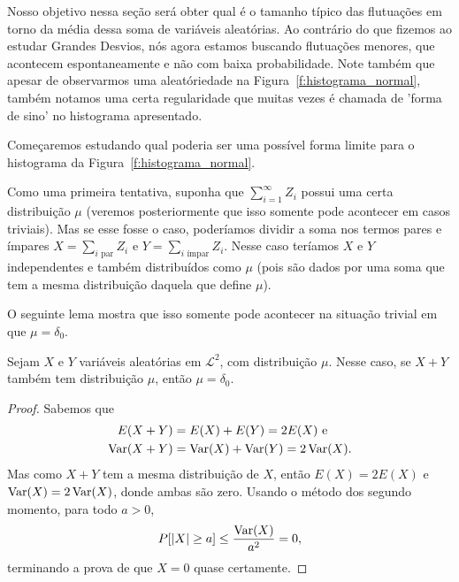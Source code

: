 Nosso objetivo nessa seção será obter qual é o tamanho típico das flutuações em torno da média dessa soma de variáveis aleatórias.
Ao contrário do que fizemos ao estudar Grandes Desvios, nós agora estamos buscando flutuações menores, 
que acontecem espontaneamente e não com baixa probabilidade.
Note também que apesar de observarmos uma aleatóriedade na Figura~\ref{f:histograma_normal}, 
também notamos uma certa regularidade que muitas vezes é chamada de 'forma de sino' no histograma apresentado.


Começaremos estudando qual poderia ser uma possível forma limite para o histograma da Figura~\ref{f:histograma_normal}.

Como uma primeira tentativa, suponha que $\sum_{i=1}^\infty Z_i$ possui uma certa distribuição $\mu$ (veremos posteriormente que isso somente pode acontecer em casos triviais).
Mas se esse fosse o caso, poderíamos dividir a soma nos termos pares e ímpares $X = \sum_{i \text{ par}} Z_i$ e $Y = \sum_{i \text{ ímpar}} Z_i$.
Nesse caso teríamos $X$ e $Y$ independentes e também distribuídos como $\mu$ (pois são dados por uma soma que tem a mesma distribuição daquela que define $\mu$).

O seguinte lema mostra que isso somente pode acontecer na situação trivial em que $\mu = \delta_0$.

\begin{lemma}
  Sejam $X$ e $Y$ variáveis aleatórias em $\mathcal{L}^2$, \iid com distribuição $\mu$.
  Nesse caso, se $X + Y$ também tem distribuição $\mu$, então $\mu = \delta_0$.
\end{lemma}

\begin{proof}
  Sabemos que
  \begin{equation}
    \begin{split}
      E(X + Y) & = E(X) + E(Y) = 2 E(X) \text{ e}\\
      \operatorname{Var}(X + Y) & = \operatorname{Var}(X) + \operatorname{Var}(Y) = 2 \operatorname{Var}(X).
    \end{split}
  \end{equation}
  Mas como $X + Y$ tem a mesma distribuição de $X$, então $E(X) = 2 E(X)$ e $\operatorname{Var}(X) = 2 \operatorname{Var}(X)$, donde ambas são zero.
  Usando o método dos segundo momento, para todo $a > 0$,
  \begin{equation}
    P[|X| \geq a] \leq \frac{\operatorname{Var}(X)}{a^2} = 0,
  \end{equation}
  terminando a prova de que $X = 0$ quase certamente.
\end{proof}


